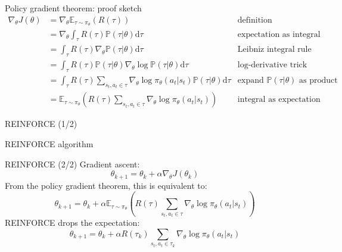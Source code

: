 \documentclass[10pt, aspectratio=1610]{beamer}
\begin{document}
\begin{frame}{Policy gradient theorem: proof sketch}
    \begin{align*}
        \nabla_{\theta} J(\theta)
        & = \nabla_{\theta} \mathbb{E}_{\tau \sim \pi_{\theta}}(R(\tau)) & \text{definition} \\
        & = \nabla_{\theta} \int_{\tau} R(\tau) \mathbb{P}(\tau|\theta) \mathrm{d}\tau & \text{expectation as integral} \\
        & = \int_{\tau} R(\tau) \nabla_{\theta} \mathbb{P}(\tau|\theta) \mathrm{d}\tau & \text{Leibniz integral rule} \\
        & = \int_{\tau} R(\tau) \mathbb{P}(\tau|\theta) \nabla_{\theta} \log \mathbb{P}(\tau|\theta) \mathrm{d}\tau & \text{log-derivative trick} \\
        & = \int_{\tau} R(\tau) \sum_{s_t, a_t \in \tau} \nabla_\theta \log \pi_\theta(a_t | s_t) \mathbb{P}(\tau|\theta) \mathrm{d}\tau & \text{expand $\mathbb{P}(\tau|\theta)$ as product} \\
        & = \mathbb{E}_{\tau \sim \pi_{\theta}} \left(R(\tau) \sum_{s_t, a_t \in \tau} \nabla_\theta \log \pi_\theta(a_t | s_t)\right) & \text{integral as expectation}
    \end{align*}
\end{frame}

\begin{frame}{REINFORCE (1/2)}
    \begin{block}{REINFORCE algorithm~\cite{sutton2018}}
        \centering
    \end{block}
\end{frame}

\begin{frame}{REINFORCE (2/2)}
    Gradient ascent:
    $$
    \theta_{k+1} = \theta_k + \alpha \nabla_\theta J(\theta_k)
    $$
    From the policy gradient theorem, this is equivalent to:
    $$
    \theta_{k+1} = \theta_k + \alpha \mathbb{E}_{\tau \sim \pi_\theta} \left(
            R(\tau)
            \sum_{s_t, a_t \in \tau} \nabla_\theta \log \pi_\theta(a_t | s_t)
            \right)
    $$
    REINFORCE drops the expectation:
    $$
    \theta_{k+1} = \theta_k + \alpha R(\tau_k) \sum_{s_t, a_t \in \tau_k} \nabla_\theta \log \pi_\theta(a_t | s_t)
    $$
\end{frame}
\end{document}
